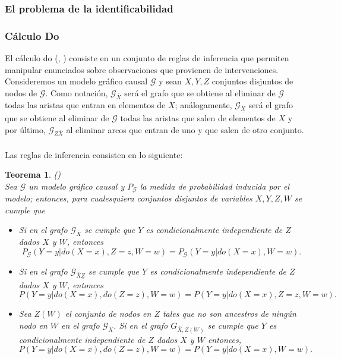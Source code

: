\documentclass[11pt]{article}
\theoremstyle{plain}
\newtheorem{teo}{Teorema}
\begin{document}
		\subsubsection{El problema de la identificabilidad} 
		
		\subsubsection{Cálculo Do}
		El cálculo do (\cite{pearl1995causal}, \cite{pearl2009causality}) consiste en un conjunto de reglas de inferencia que permiten manipular enunciados sobre observaciones que provienen de 		intervenciones. Consideremos un modelo gráfico causal $\mathcal{G}$ y sean $X,Y,Z$ conjuntos disjuntos de nodos de $\mathcal{G}$. Como notación, $\mathcal{G}_{\bar{X}}$ será el grafo que 	se obtiene al eliminar de $\mathcal{G}$ todas las aristas que entran en elementos de $X$; análogamente, $\mathcal{G}_{\underline{X}}$ será el grafo que se obtiene al eliminar de $\mathcal{G}$ todas las aristas que salen de elementos de $X$ y por último, $\mathcal{G}_{\underline{Z}\bar{X}}$ al eliminar arcos que entran de uno y que salen de otro conjunto.\\
	\\
		Las reglas de inferencia consisten en lo siguiente:
		\begin{teo}{\label{docalculus}} (\cite{pearl2009causality})\\
		Sea $\mathcal{G}$ un modelo gráfico causal y $P_{\mathcal{G}}$ la medida de probabilidad inducida por el modelo; entonces, para cualesquiera conjuntos disjuntos de variables $X,Y,Z,W$ se cumple que
		\begin{itemize}
		\item Si en el grafo $\mathcal{G}_{\bar{X}}$ se cumple que $Y$ es condicionalmente independiente de $Z$ dados $X$ y $W$, entonces
		\[ P_{\mathcal{G}}(Y=y | do(X=x), Z=z, W=w) = P_{\mathcal{G}}(Y=y | do(X=x), W=w). \]
		\item Si en el grafo $\mathcal{G}_{\bar{X}\underline{Z}}$ se cumple que $Y$ es condicionalmente independiente de $Z$ dados $X$ y $W$, entonces
		\[ P(Y=y | do(X=x), do(Z=z), W=w) = P(Y=y | do(X=x), Z = z, W=w). \]
		\item Sea $Z(W)$ el conjunto de nodos en $Z$ tales que no son ancestros de ningún nodo en $W$ en el grafo $\mathcal{G}_{\bar{X}}$. Si en el grafo $G_{\bar{X}, \bar{Z(W)}}$ se cumple que $Y$ es condicionalmente independiente de $Z$ dados $X$ y $W$ entonces,
		\[ P(Y=y | do(X=x), do(Z=z), W=w) = P(Y=y | do(X=x), W=w). \]
		\end{itemize}
		\end{teo}
		
\end{document}
